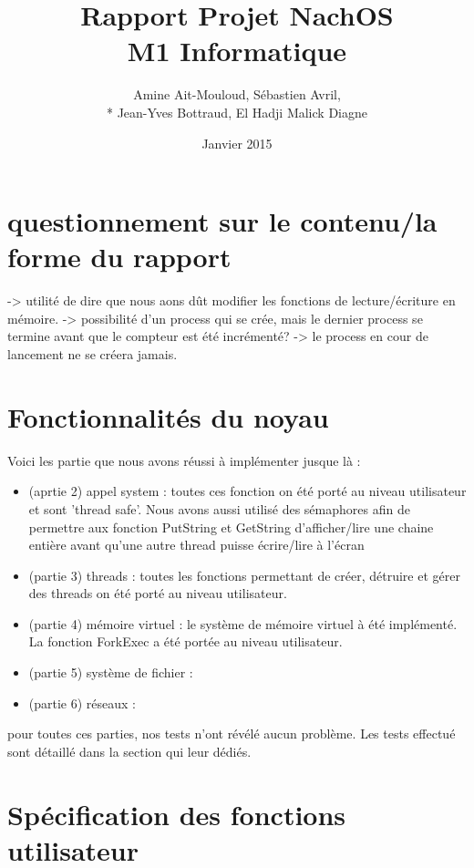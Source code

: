 \documentclass{article}
\begin{document}
\title {Rapport Projet NachOS \\ M1 Informatique}
\author{Amine Ait-Mouloud, Sébastien Avril,\\* Jean-Yves Bottraud, El Hadji Malick Diagne}
\date{Janvier 2015}
\maketitle

\section{questionnement sur le contenu/la forme du rapport}
	-> utilité de dire que nous aons dût modifier les fonctions de lecture/écriture en mémoire.
	-> possibilité d'un process qui se crée, mais le dernier process se termine avant que le compteur est été incrémenté? -> le process en cour de lancement ne se créera jamais.

\tableofcontents{}
\newpage
\section{Fonctionnalités du noyau}
	Voici les partie que nous avons réussi à implémenter jusque là :
	\begin{itemize}
		\item (aprtie 2) appel system : toutes ces fonction on été porté au niveau utilisateur et sont 'thread safe'. Nous avons aussi utilisé des sémaphores afin de permettre aux fonction PutString et GetString d'afficher/lire une chaine entière avant qu'une autre thread puisse écrire/lire à l'écran
		\item (partie 3) threads : toutes les fonctions permettant de créer, détruire et gérer des threads on été porté au niveau utilisateur.
		\item (partie 4) mémoire virtuel : le système de mémoire virtuel à été implémenté. La fonction ForkExec a été portée au niveau utilisateur.
		\item (partie 5) système de fichier :
		\item (partie 6) réseaux :
	\end{itemize}
	pour toutes ces parties, nos tests n'ont révélé aucun problème. Les tests effectué sont détaillé dans la section qui leur dédiés.

\section{Spécification des fonctions utilisateur}
\end{document}
